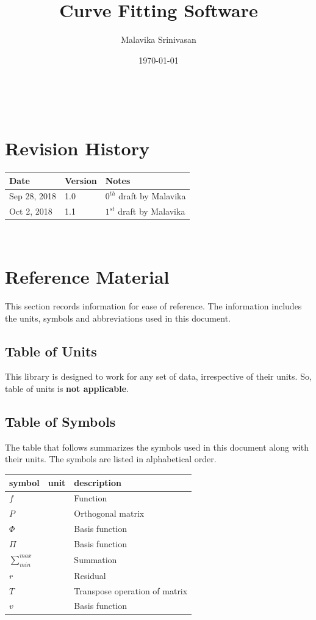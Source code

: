 \documentclass[12pt]{article}
\begin{document}
\title{Curve Fitting Software} 
\author{Malavika Srinivasan}
\date{\today}

\maketitle

~\newpage


\section{Revision History}

\begin{tabularx}{\textwidth}{p{3cm}p{2cm}X}
\toprule {\bf Date} & {\bf Version} & {\bf Notes}\\
\midrule
Sep 28, 2018 & 1.0 & $0^{th}$ draft by Malavika\\
Oct 2, 2018 & 1.1 & $1^{st}$ draft by Malavika\\
\bottomrule
\end{tabularx}

~\newpage
	
\section{Reference Material}

This section records information for ease of reference. The information includes the units, symbols and abbreviations used in this document.

\subsection{Table of Units}
This library is designed to work for any set of data, irrespective of their units. So, table of units is \textbf{not applicable}. 



\subsection{Table of Symbols}

The table that follows summarizes the symbols used in this document along with
their units. The symbols are listed in alphabetical order.

\renewcommand{\arraystretch}{1.2}
\noindent \begin{longtable*}{l l p{12cm}} \toprule
\textbf{symbol} & \textbf{unit} & \textbf{description}\\
\midrule 
$f$ & & Function\\
$P$ & & Orthogonal matrix\\
$\Phi$ & & Basis function\\
$\Pi$ & & Basis function\\
$\sum_{min}^{max}$& & Summation \\ 
$r$ & & Residual\\
$T$ & & Transpose operation of matrix\\
$v$ & & Basis function\\
\bottomrule
\end{longtable*}
\end{document}
